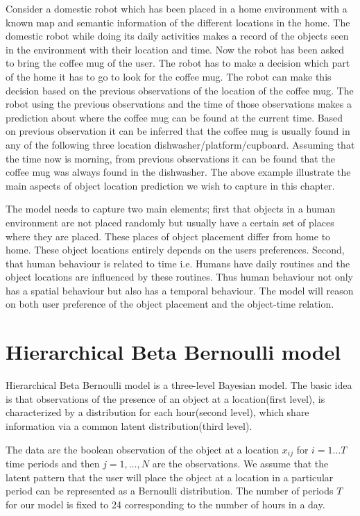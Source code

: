 Consider a domestic robot which has been placed in a home environment with a known map
and semantic information of the different locations in the home. The domestic robot while doing its daily activities 
makes a record of the objects seen in the environment with
their location and time. Now the robot has been asked to bring the coffee mug
of the user.
The robot has to make a decision which part of the home it has to go to look for
the coffee mug.
The robot can make this decision based on the previous observations of the 
location of the coffee mug.
The robot using the previous observations and the time of those observations 
makes a prediction about where the coffee mug can be found at the current time.
Based on previous observation it can be
inferred that the coffee mug is usually found in any of the following three location
dishwasher/platform/cupboard. Assuming that the time now is morning, from
previous observations it can be found that the coffee mug was always found  in the
dishwasher. The above example illustrate the main aspects of object location
prediction we wish to capture in this chapter.


The model needs to capture two main
elements; first that objects in a human environment are not placed randomly but
usually have a certain set of places where they are placed.
These places of object placement differ from home
to home. These object locations entirely depends on the users preferences.  
Second, that human behaviour is related to time i.e. Humans have daily routines  and the object locations are influenced by these routines.
Thus human behaviour not only  has a spatial behaviour but also has a temporal behaviour.
The model will reason on both user preference of the object placement and the
object-time relation.

\section{Hierarchical Beta Bernoulli model}


Hierarchical Beta Bernoulli model is a three-level Bayesian model. The basic idea is that observations of the presence of an object at a location(first level), is characterized by a distribution for each hour(second level), which share information via a common latent distribution(third level).

The data are the boolean observation of the object at a location $x_{ij}$ for $i = 1 \dots T$ time periods and then $j = 1, \dots , N$  are the observations.  We assume that the latent pattern that the user will place the object at a  location in a particular period can be represented as a Bernoulli distribution. The number of periods $T$ for our model is fixed to 24 corresponding to the number of hours in a day. 


